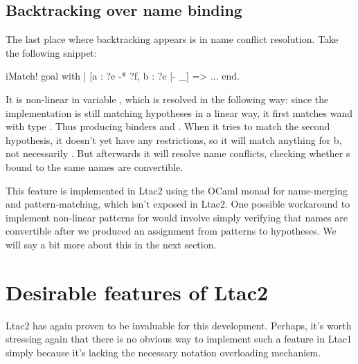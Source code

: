 \subsection{Backtracking over name binding}

The last place where backtracking appears is in name conflict resolution.
Take the following snippet:

\begin{coq}
iMatch! goal with
| [a : ?e -* ?f, b : ?e |- _] => ...
end.
\end{coq}

It is non-linear in variable , which is resolved in the following way:
since the implementation is still matching hypotheses in a linear way, it first matches wand  with type .
Thus producing binders  and .
When it tries to match the second hypothesis, it doesn't yet have any restrictions, so it will match anything for b, not necessarily .
But afterwards it will resolve name conflicts, checking whether s bound to the same names are convertible.

This feature is implemented in Ltac2 using the OCaml monad for name-merging and pattern-matching, which isn't exposed in Ltac2.
One possible workaround to implement non-linear patterns for  would involve simply verifying that names are convertible after we produced an assignment from patterns to hypotheses.
We will say a bit more about this in the next section.

\section{Desirable features of Ltac2}
\label{sec:desir-feat-ltac2-five}

Ltac2 has again proven to be invaluable for this development.
Perhaps, it's worth stressing again that there is no obvious way to implement such a feature in Ltac1 simply because it's lacking the necessary notation overloading mechanism.


